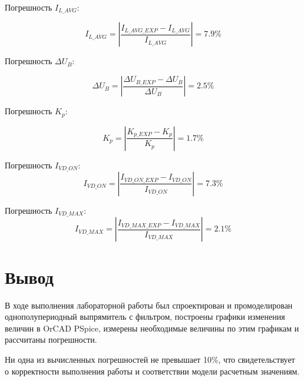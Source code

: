 Погрешность $I_{L\_AVG}$:

\[
I_{L\_AVG}=\left | \frac{I_{L\_AVG\_EXP}-I_{L\_AVG}}{I_{L\_AVG}} \right |= 7.9 \%
\]

Погрешность $\Delta U_B$: 

\[
\Delta U_B=\left | \frac{\Delta U_{B\_EXP}-\Delta U_B}{\Delta U_B} \right |= 2.5 \%
\]

Погрешность $K_p$:

\[
K_p=\left | \frac{K_{p\_EXP}-K_p}{K_p} \right |= 1.7 \%
\]


Погрешность $I_{VD\_ON}$:
\[
I_{VD\_ON} =\left |  \frac{I_{VD\_ON\_EXP}-I_{VD\_ON}}{I_{VD\_ON}}\right |=7.3 \%
\]

Погрешность $I_{VD\_MAX}$:
\[
I_{VD\_MAX}=\left |  \frac{I_{VD\_MAX\_EXP}-I_{VD\_MAX}}{I_{VD\_MAX}} \right |=2.1 \%
\]

\chapter{Вывод}

В ходе выполнения лабораторной работы был спроектирован и промоделирован однополупериодный выпрямитель с фильтром, построены графики изменения величин в OrCAD PSpice, измерены необходимые величины по этим графикам и рассчитаны погрешности.

Ни одна из вычисленных погрешностей не превышает 10\%, что свидетельствует о корректности выполнения работы и соответствии модели расчетным значениям.